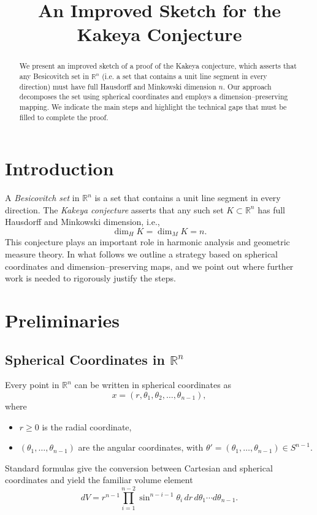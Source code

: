 \documentclass{amsart}
\title{An Improved Sketch for the Kakeya Conjecture}
\author{}
\date{}
\begin{document}
\maketitle

\begin{abstract}
We present an improved sketch of a proof of the Kakeya conjecture, which asserts that any Besicovitch set in $\mathbb{R}^n$ (i.e. a set that contains a unit line segment in every direction) must have full Hausdorff and Minkowski dimension $n$. Our approach decomposes the set using spherical coordinates and employs a dimension–preserving mapping. We indicate the main steps and highlight the technical gaps that must be filled to complete the proof.
\end{abstract}

\section{Introduction}
A \emph{Besicovitch set} in $\mathbb{R}^n$ is a set that contains a unit line segment in every direction. The \emph{Kakeya conjecture} asserts that any such set $K\subset\mathbb{R}^n$ has full Hausdorff and Minkowski dimension, i.e.,
\[
\dim_H K = \dim_M K = n.
\]
This conjecture plays an important role in harmonic analysis and geometric measure theory. In what follows we outline a strategy based on spherical coordinates and dimension–preserving maps, and we point out where further work is needed to rigorously justify the steps.

\section{Preliminaries}
\subsection{Spherical Coordinates in $\mathbb{R}^n$}
Every point in $\mathbb{R}^n$ can be written in spherical coordinates as 
\[
x=(r,\theta_1,\theta_2,\dots,\theta_{n-1}),
\]
where 
\begin{itemize}
    \item $r\ge0$ is the radial coordinate,
    \item $(\theta_1,\dots,\theta_{n-1})$ are the angular coordinates, with $\theta'=(\theta_1,\dots,\theta_{n-1})\in S^{n-1}$.
\end{itemize}
Standard formulas give the conversion between Cartesian and spherical coordinates and yield the familiar volume element
\[
dV = r^{n-1}\prod_{i=1}^{n-2}\sin^{n-i-1}\theta_i \, dr \, d\theta_1 \cdots d\theta_{n-1}.
\]
\end{document}
